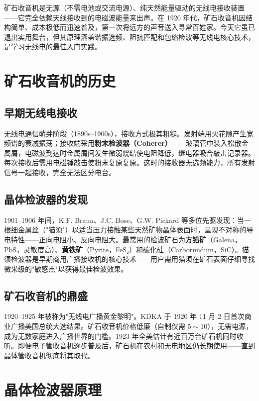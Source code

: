 \documentclass[12pt,UTF8]{ctexbook}
\begin{document}
矿石收音机是无源（不需电池或交流电源）、纯天然能量驱动的无线电接收装置——它完全依赖天线接收到的电磁波能量来出声。在 1920 年代，矿石收音机因结构简单、成本极低而迅速普及，第一次将远方的声音送入寻常百姓家。今天它虽已退出实用舞台，但其原理涵盖谐振选频、阻抗匹配和包络检波等无线电核心技术，是学习无线电的最佳入门实践。

\section{矿石收音机的历史}
\label{sec:crystal_radio_history}

\subsection{早期无线电接收}

无线电通信萌芽阶段（1890s–1900s），接收方式极其粗糙。发射端用火花隙产生宽频谱的衰减振荡；接收端采用\textbf{粉末检波器（Coherer）}——玻璃管中装入松散金属屑，电磁波到达时金属屑间发生微弱烧结使电阻降低，继电器吸合敲击记录器。每次接收后需用电磁锤敲击使粉末复原复原。这时的接收器无选频能力，所有发射信号一起接收，完全无法区分电台。

\subsection{晶体检波器的发现}

1901–1906 年间，K.F. Braun、J.C. Bose、G.W. Pickard 等多位先驱发现：当一根细金属丝（"猫须"）以适当压力接触某些天然矿物晶体表面时，呈现不对称的导电特性——正向电阻小、反向电阻大。最常用的检波矿石为\textbf{方铅矿}（Galena，PbS，灵敏度高）、\textbf{黄铁矿}（Pyrite，FeS₂）和碳化硅（Carborundum，SiC）。猫须检波器是早期商用广播接收机的核心技术——用户需用猫须在矿石表面仔细寻找微米级的"敏感点"以获得最佳检波效果。

\subsection{矿石收音机的鼎盛}

1920–1925 年被称为"无线电广播黄金黎明"。KDKA 于 1920 年 11 月 2 日首次商业广播美国总统大选结果。矿石收音机价格低廉（自制仅需 $5\sim10$），无需电源，成为无数家庭进入广播世界的门槛。1923 年全美估计有近百万台矿石机同时收听。即便电子管收音机逐步普及后，矿石机在农村和无电地区仍长期使用——直到晶体管收音机彻底将其取代。

\section{晶体检波器原理}
\label{sec:crystal_detector}
\end{document}
